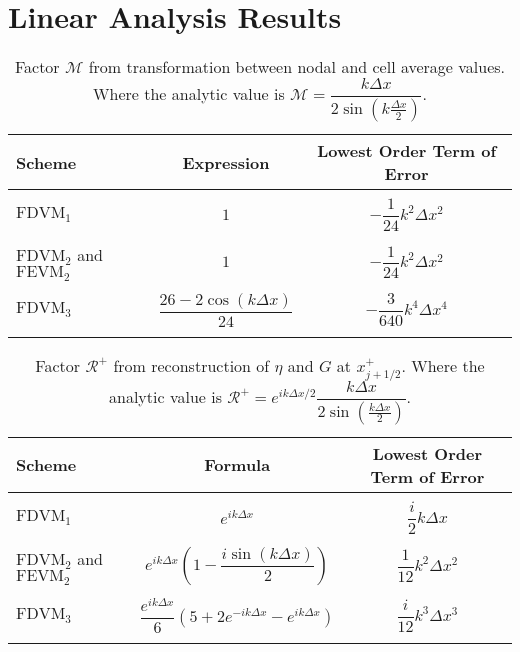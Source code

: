 \chapter{Linear Analysis Results}
\label{app:LinAnal}

\begin{table}
	\centering
	\begin{tabular}{l  c  c}
		Scheme& Expression& Lowest Order Term of Error \\
		\hline && \\
		$\text{FDVM}_1$ & $1$ & $-\dfrac{1}{24}k^2 \Delta x^2$ \\ & & \\
		$\text{FDVM}_2$ and $\text{FEVM}_2$& $1$ & $-\dfrac{1}{24}k^2 \Delta x^2$ \\ & & \\
		$\text{FDVM}_3$& $\dfrac{26 - 2 \cos\left(k \Delta x\right)}{24}$ & $-\dfrac{3}{640}k^4 \Delta x^4$ \\ & & \\
	\end{tabular}
	\caption{Factor $\mathcal{M}$ from transformation between nodal and cell average values. Where the analytic value is $\mathcal{M} = \dfrac{k\Delta x}{2 \sin \left(k\frac{\Delta x}{2}\right)  }$.}
	\label{tab:Mfactor}
\end{table}

\begin{table}
	\centering
	\begin{tabular}{l  c  c}
		Scheme& Formula& Lowest Order Term of Error\\
		\hline && \\
		$\text{FDVM}_1$ & $e^{i k {\Delta x}}$ & $\dfrac{i}{2}k \Delta x$ \\ & & \\
		$\text{FDVM}_2$ and $\text{FEVM}_2$& $e^{i k {\Delta x}} \left(1 - \dfrac{i \sin\left(k\Delta x \right)}{2} \right)$ & $\dfrac{1}{12}k^2 \Delta x^2$ \\ & & \\
		$\text{FDVM}_3$& $\dfrac{e^{i k {\Delta x}}}{6}\left({5 + 2e^{-i k {\Delta x}} - e^{i k {\Delta x}}} \right)$ & $\dfrac{i}{12}k^3 \Delta x^3$ \\ & & \\
	\end{tabular}
	\caption{Factor $\mathcal{R}^+$ from reconstruction of $\eta$ and $G$ at $x^+_{j+1/2}$. Where the analytic value is $\mathcal{R}^+ =e^{i k \Delta x/2} \dfrac{k\Delta x}{2 \sin\left(\frac{k \Delta x}{2}\right)}$. }
	\label{tab:Rpfactor}
\end{table}

